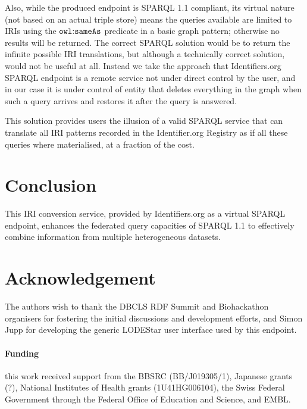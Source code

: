 \documentclass{bioinfo}
\begin{document}

Also, while the produced endpoint is SPARQL 1.1 compliant, its virtual nature (not based on an actual triple store) means the queries available are limited to IRIs using the $\mathtt{owl\text{\rm :}{}sameAs}$ predicate in a basic graph pattern; otherwise no results will be returned. The correct SPARQL solution would be to return the infinite possible IRI translations, but although a technically correct solution, would not be useful at all. Instead we take the approach that Identifiers.org SPARQL endpoint is a remote service not under direct control by the user, and in our case it is under control of entity that deletes everything in the graph when such a query arrives and restores it after the query is answered.

This solution provides users the illusion of a valid SPARQL service that can translate all IRI patterns recorded in the Identifier.org Registry as if all these queries where materialised, at a fraction of the cost.

\section{Conclusion}
This IRI conversion service, provided by Identifiers.org as a virtual SPARQL endpoint, enhances the federated query capacities of SPARQL 1.1 to effectively combine information from multiple heterogeneous datasets.

\section*{Acknowledgement}
The authors wish to thank the DBCLS RDF Summit and Biohackathon organisers for fostering the initial discussions and development efforts, and Simon Jupp for developing the generic LODEStar user interface used by this endpoint.

\paragraph{Funding\textcolon} this work received support from the BBSRC (BB/J019305/1), Japanese grants (?), National Institutes of Health grants (1U41HG006104), the Swiss Federal Government through the Federal Office of Education and Science, and EMBL.  


%
%
%
%
%
%
%
%
  
\end{document}
